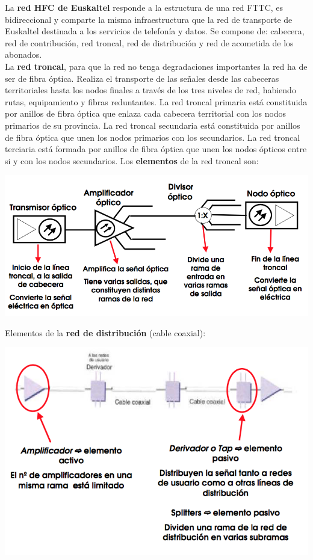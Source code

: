 \documentclass[10pt,portrait, twocolumn]{article}
\begin{document}
La \textbf{red HFC de Euskaltel} responde a la estructura de una red FTTC, es bidireccional y comparte la misma infraestructura que la red de transporte de Euskaltel destinada a los servicios de telefonía y datos. Se compone de: cabecera, red de contribución, red troncal, red de distribución y red de acometida de los abonados.\\

	
La \textbf{red troncal}, para que la red no tenga degradaciones importantes la red ha de ser de fibra óptica. Realiza el transporte de las señales desde las cabeceras territoriales hasta los nodos finales a través de los tres niveles de red, habiendo rutas, equipamiento y fibras reduntantes. La red troncal primaria está constituida por anillos de fibra óptica que enlaza cada cabecera territorial con los nodos primarios de su provincia. La red troncal secundaria está constituida por anillos de fibra óptica que unen los nodos primarios con los secundarios. La red troncal terciaria está formada por anillos de fibra óptica que unen los nodos ópticos entre si y con los nodos secundarios. Los \textbf{elementos} de la red troncal son:

	\begin{center}
		\includegraphics[scale=0.4]{images/RedTroncal}
	\end{center}
	
Elementos de la \textbf{red de distribución} (cable coaxial):

	\begin{center}
		\includegraphics[scale=0.4]{images/RedDistribucion}
	\end{center}
\end{document}
